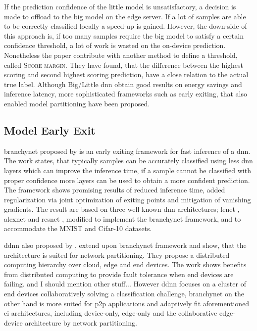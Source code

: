 If the prediction confidence of the little model is unsatisfactory, a decision is made to offload to the big model on the edge server. If a lot of samples are able to be correctly classified locally a speed-up is gained. However, the down-side of this approach is, if too many samples require the big model to satisfy a certain confidence threshold, a lot of work is wasted on the on-device prediction. Nonetheless the paper \cite{park_big/little_2015} contribute with another method to define a threshold, called \textsc{Score margin}. They have found, that the difference between the highest scoring and second highest scoring prediction, have a close relation to the actual true label. Although Big/Little \gls{dnn} obtain good results on energy savings and inference latency, more sophisticated frameworks such as early exiting, that also enabled model partitioning have been proposed.

\subsection{Model Early Exit}

\gls{branchynet} \cite{teerapittayanon_branchynet:_2016} proposed by \citeauthor{teerapittayanon_branchynet:_2016} is an early exiting framework for fast inference of a \gls{dnn}. The work states, that typically samples can be accurately classified using less \gls{dnn} layers which can improve the inference time, if a sample cannot be classified with proper confidence more layers can be used to obtain a more confident prediction. The framework shows promising results of reduced inference time, added regularization via joint optimization of exiting points and mitigation of vanishing gradients. The result are based on three well-known \gls{dnn} architectures; \gls{lenet} \cite{lecun_lecun-98.pdf_1998}, \gls{alexnet} \cite{krizhevsky_imagenet_2017} and \gls{resnet} \cite{he_deep_2015}, modified to implement the \gls{branchynet} framework, and to accommodate the MNIST \cite{lecun_mnist_2010} and Cifar-10 \cite{krizhevsky_cifar-10_nodate} datasets.  

\gls{ddnn} \cite{teerapittayanon_distributed_2017} also proposed by \citeauthor{teerapittayanon_distributed_2017}, extend upon \gls{branchynet} framework and show, that the architecture is suited for network partitioning. They propose a distributed computing hierarchy over cloud, edge and end devices. The work shows benefits from distributed computing to provide fault tolerance when end devices are failing. and I should mention other stuff... However \gls{ddnn} focuses on a cluster of end devices collaboratively solving a classification challenge, \gls{branchynet} on the other hand is more suited for \gls{p2p} applications and adaptively fit aforementioned \gls{ei} architectures, including device-only, edge-only and the collaborative edge-device architecture by network partitioning.



